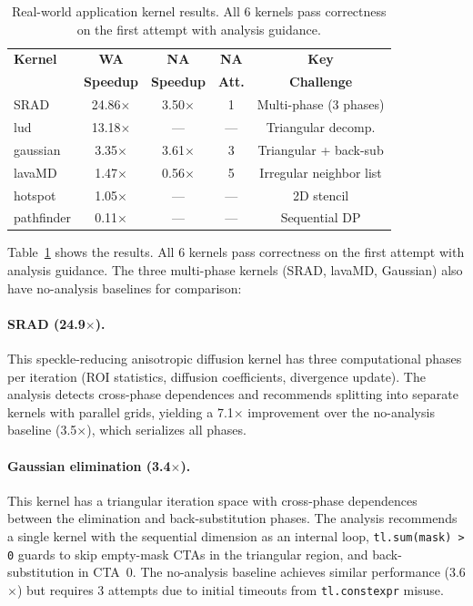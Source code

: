 \documentclass[sigconf]{acmart}
\begin{document}
\begin{table}[t]
  \caption{Real-world application kernel results.  All 6 kernels pass
    correctness on the first attempt with analysis guidance.}
  \label{tab:realworld}
  \centering\small
  \begin{tabular}{lcccc}
    \toprule
    \textbf{Kernel} & \textbf{WA} & \textbf{NA} & \textbf{NA} & \textbf{Key} \\
    & \textbf{Speedup} & \textbf{Speedup} & \textbf{Att.} & \textbf{Challenge} \\
    \midrule
    SRAD        & 24.86$\times$ & 3.50$\times$ & 1 & Multi-phase (3 phases) \\
    lud         & 13.18$\times$ & --- & --- & Triangular decomp. \\
    gaussian    & 3.35$\times$  & 3.61$\times$ & 3 & Triangular + back-sub \\
    lavaMD      & 1.47$\times$  & 0.56$\times$ & 5 & Irregular neighbor list \\
    hotspot     & 1.05$\times$  & --- & --- & 2D stencil \\
    pathfinder  & 0.11$\times$  & --- & --- & Sequential DP \\
    \bottomrule
  \end{tabular}
\end{table}

Table~\ref{tab:realworld} shows the results.  All 6 kernels pass
correctness on the first attempt with analysis guidance.  The three
multi-phase kernels (SRAD, lavaMD, Gaussian) also have no-analysis
baselines for comparison:

\paragraph{SRAD (24.9$\times$).}
This speckle-reducing anisotropic diffusion kernel has three
computational phases per iteration (ROI statistics, diffusion
coefficients, divergence update).  The analysis detects cross-phase
dependences and recommends splitting into separate kernels with
parallel grids, yielding a 7.1$\times$ improvement over the
no-analysis baseline (3.5$\times$), which serializes all phases.

\paragraph{Gaussian elimination (3.4$\times$).}
This kernel has a triangular iteration space with cross-phase
dependences between the elimination and back-substitution phases.
The analysis recommends a single kernel with the sequential dimension
as an internal loop, \texttt{tl.sum(mask) > 0} guards to skip
empty-mask CTAs in the triangular region, and back-substitution in
CTA~0.  The no-analysis baseline achieves similar performance
(3.6$\times$) but requires 3 attempts due to initial timeouts from
\texttt{tl.constexpr} misuse.
\end{document}
